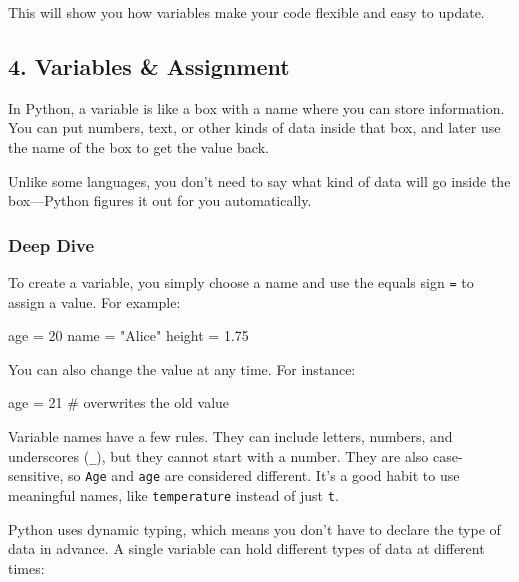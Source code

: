 \documentclass[
  letterpaper,
  DIV=11,
  numbers=noendperiod]{scrreprt}
\newenvironment{Shaded}{\begin{snugshade}}{\end{snugshade}}
\newcommand{\CommentTok}[1]{\textcolor[rgb]{0.37,0.37,0.37}{#1}}
\newcommand{\DecValTok}[1]{\textcolor[rgb]{0.68,0.00,0.00}{#1}}
\newcommand{\FloatTok}[1]{\textcolor[rgb]{0.68,0.00,0.00}{#1}}
\newcommand{\NormalTok}[1]{\textcolor[rgb]{0.00,0.23,0.31}{#1}}
\newcommand{\OperatorTok}[1]{\textcolor[rgb]{0.37,0.37,0.37}{#1}}
\newcommand{\StringTok}[1]{\textcolor[rgb]{0.13,0.47,0.30}{#1}}
\begin{document}
This will show you how variables make your code flexible and easy to
update.

\subsection{4. Variables \& Assignment}\label{variables-assignment-1}

In Python, a variable is like a box with a name where you can store
information. You can put numbers, text, or other kinds of data inside
that box, and later use the name of the box to get the value back.

Unlike some languages, you don't need to say what kind of data will go
inside the box---Python figures it out for you automatically.

\subsubsection{Deep Dive}\label{deep-dive-4}

To create a variable, you simply choose a name and use the equals sign
\texttt{=} to assign a value. For example:

\begin{Shaded}
\begin{Highlighting}[]
\NormalTok{age }\OperatorTok{=} \DecValTok{20}
\NormalTok{name }\OperatorTok{=} \StringTok{"Alice"}
\NormalTok{height }\OperatorTok{=} \FloatTok{1.75}
\end{Highlighting}
\end{Shaded}

You can also change the value at any time. For instance:

\begin{Shaded}
\begin{Highlighting}[]
\NormalTok{age }\OperatorTok{=} \DecValTok{21}   \CommentTok{\# overwrites the old value}
\end{Highlighting}
\end{Shaded}

Variable names have a few rules. They can include letters, numbers, and
underscores (\texttt{\_}), but they cannot start with a number. They are
also case-sensitive, so \texttt{Age} and \texttt{age} are considered
different. It's a good habit to use meaningful names, like
\texttt{temperature} instead of just \texttt{t}.

Python uses dynamic typing, which means you don't have to declare the
type of data in advance. A single variable can hold different types of
data at different times:
\end{document}
